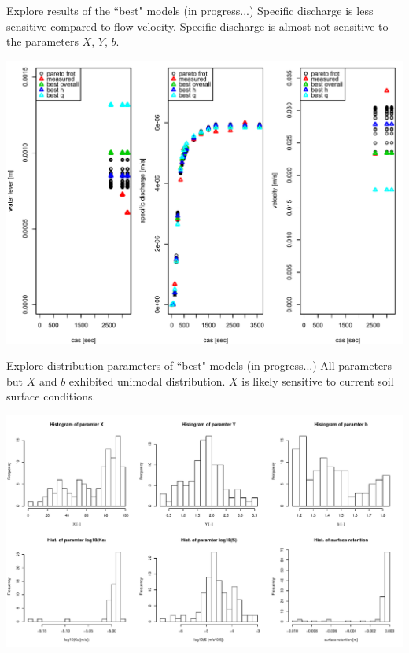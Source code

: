 \begin{frame}{Explore results of the ``best" models (in progress...)}
   Specific discharge is less sensitive compared to flow velocity. Specific discharge is almost not sensitive to the parameters $X$, $Y$, $b$.
   \begin{center}
   \includegraphics[width=0.6\paperwidth]{img/priklad}
   \end{center}
\end{frame}


\begin{frame}{Explore distribution parameters of ``best" models (in progress...)}
   All parameters but $X$ and $b$ exhibited unimodal distribution. $X$ is likely sensitive to current soil surface conditions. 
   \begin{center}
   \includegraphics[width=0.7\paperwidth]{img/hystogram}
   \end{center}
\end{frame}


